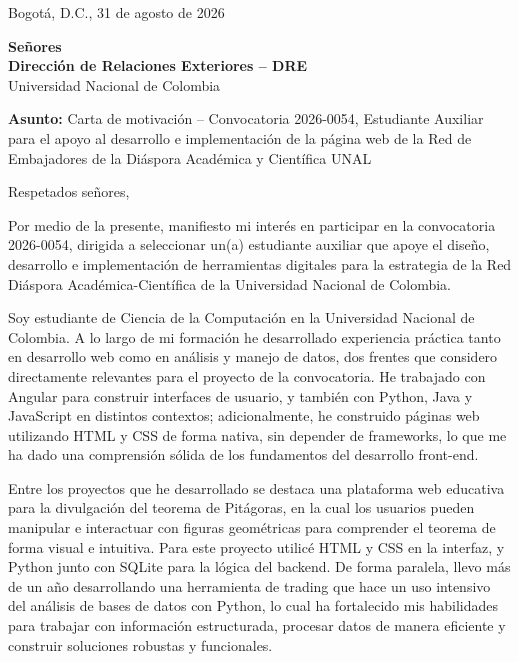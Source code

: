 \documentclass[11pt]{letter}
\begin{document}
\begin{flushright}
Bogotá, D.C., 31 de agosto de 2026
\end{flushright}

\textbf{Señores} \\
\textbf{Dirección de Relaciones Exteriores -- DRE} \\
Universidad Nacional de Colombia

\vspace{0.5cm}

\textbf{Asunto:} Carta de motivación -- Convocatoria 2026-0054, Estudiante Auxiliar para el apoyo al desarrollo e implementación de la página web de la Red de Embajadores de la Diáspora Académica y Científica UNAL

\vspace{0.3cm}

Respetados señores,

\vspace{0.3cm}

Por medio de la presente, manifiesto mi interés en participar en la convocatoria 2026-0054, dirigida a seleccionar un(a) estudiante auxiliar que apoye el diseño, desarrollo e implementación de herramientas digitales para la estrategia de la Red Diáspora Académica-Científica de la Universidad Nacional de Colombia.

Soy estudiante de Ciencia de la Computación en la Universidad Nacional de Colombia. A lo largo de mi formación he desarrollado experiencia práctica tanto en desarrollo web como en análisis y manejo de datos, dos frentes que considero directamente relevantes para el proyecto de la convocatoria. He trabajado con Angular para construir interfaces de usuario, y también con Python, Java y JavaScript en distintos contextos; adicionalmente, he construido páginas web utilizando HTML y CSS de forma nativa, sin depender de frameworks, lo que me ha dado una comprensión sólida de los fundamentos del desarrollo front-end.

Entre los proyectos que he desarrollado se destaca una plataforma web educativa para la divulgación del teorema de Pitágoras, en la cual los usuarios pueden manipular e interactuar con figuras geométricas para comprender el teorema de forma visual e intuitiva. Para este proyecto utilicé HTML y CSS en la interfaz, y Python junto con SQLite para la lógica del backend. De forma paralela, llevo más de un año desarrollando una herramienta de trading que hace un uso intensivo del análisis de bases de datos con Python, lo cual ha fortalecido mis habilidades para trabajar con información estructurada, procesar datos de manera eficiente y construir soluciones robustas y funcionales.
\end{document}
